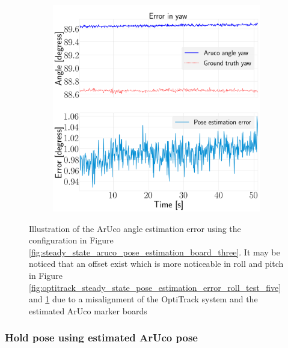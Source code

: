 \documentclass[../Head/report.tex]{subfiles}
\begin{document}
\begin{figure}[H]
\begin{subfigure}[t]{.30\textwidth}
        \caption{}
        \label{fig:optitrack_steady_state_pose_estimation_error_pitch_test_five}
    \end{subfigure}
     \hspace{0.2em}
    \begin{subfigure}[t]{.30\textwidth}
        \centering
        \includegraphics[width=\textwidth]{../Figures/optitrack/steady_aruco_pose_estimation/pose_error_yaw_test1.png}
        \caption{}
        \label{fig:optitrack_steady_state_pose_estimation_error_yaw_test_five}
    \end{subfigure}
    \caption{Illustration of the ArUco angle estimation error using the configuration in Figure \ref{fig:steady_state_aruco_pose_estimation_board_three}. It may be noticed that an offset exist which is more noticeable in roll and pitch in Figure \ref{fig:optitrack_steady_state_pose_estimation_error_roll_test_five} and \ref{fig:optitrack_steady_state_pose_estimation_error_pitch_test_five} due to a misalignment of the OptiTrack system and the estimated ArUco marker boards}
    \label{fig:optitrack_steady_state_pose_estimation_error_ori_test_five}
\end{figure}


\subsubsection{Hold pose using estimated ArUco pose}
\label{sec:hold_pose_using_estimated_aruco_pose}
\end{document}

